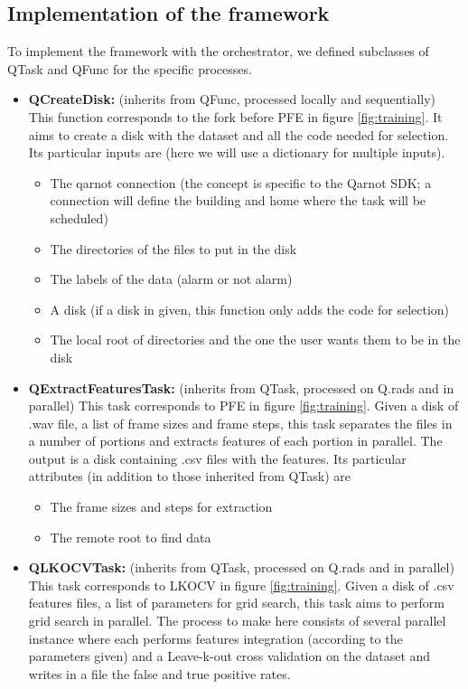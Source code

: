 \documentclass[10pt, conference, compsocconf]{IEEEtran}
\begin{document}
\subsection{Implementation of the framework}
To implement the framework with the orchestrator, we defined subclasses of QTask and QFunc for the specific processes.
\begin{itemize}
\item \textbf{QCreateDisk:} (inherits from QFunc, processed locally and sequentially) This function corresponds to the fork before PFE in figure \ref{fig:training}. It aims to create a disk with the dataset and all the code needed for selection.
  Its particular inputs are (here we will use a dictionary for multiple inputs).
  \begin{itemize}
  \item The qarnot connection (the concept is specific to the Qarnot SDK; a connection will define the building and home where the task will be scheduled)
  \item The directories of the files to put in the disk
  \item The labels of the data (alarm or not alarm)
  \item A disk (if a disk in given, this function only adds the code for selection)
  \item The local root of directories and the one the user wants them to be in the disk
  \end{itemize}
\item \textbf{QExtractFeaturesTask:} (inherits from QTask, processed on Q.rads and in parallel) This task corresponds to PFE in figure \ref{fig:training}. Given a disk of .wav file, a list of frame sizes and frame steps, this task separates the files in a number of portions and extracts features of each portion in parallel. The output is a disk containing .csv files with the features.
  Its particular attributes (in addition to those inherited from QTask) are
  \begin{itemize}
  \item The frame sizes and steps for extraction
  \item The remote root to find data
  \end{itemize}
\item \textbf{QLKOCVTask:} (inherits from QTask, processed on Q.rads and in parallel) This task corresponds to LKOCV in figure \ref{fig:training}. Given a disk of .csv features files, a list of parameters for grid search, this task aims to perform grid search in parallel. The process to make here consists of several parallel instance where each performs features integration (according to the parameters given) and a Leave-k-out cross validation on the dataset and writes in a file the false and true positive rates.

\end{itemize}
\end{document}
